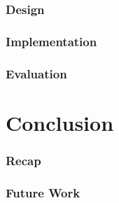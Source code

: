 \documentclass[11pt,a4paper,notitlepage]{article}
\begin{document}
\section{Design}



\section{Implementation}



\section{Evaluation}



\part{Conclusion}

\section{Recap}

\section{Future Work}




 
\end{document}
